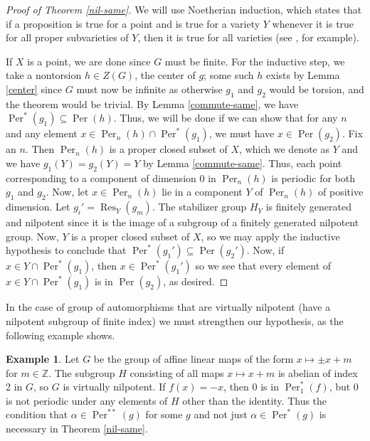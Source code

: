 \documentclass{amsart}
\newcommand{\bZ} {\mathbb{Z}}
\DeclareMathOperator{\Per}{Per}
\DeclareMathOperator{\Res}{Res}
\theoremstyle{definition}
\newtheorem{example}[thm]{Example}
\begin{document}
\begin{proof}[Proof of Theorem \ref{nil-same}]
 
  We will use Noetherian induction, which states that if a proposition
  is true for a point and is true for a variety $Y$ whenever it is
  true for all proper subvarieties of $Y$, then it is true for all
  varieties (see \cite[Ex. II.3.16]{Har}, for example).  

  If $X$ is a point, we are done since $G$ must be finite.  For the
  inductive step, we take a nontorsion $h \in Z(G)$, the center of
  $g$; some such $h$ exists by Lemma \ref{center} since $G$ must now
  be infinite as otherwise $g_1$ and $g_2$ would be torsion, and the
  theorem would be trivial.  By Lemma \ref{commute-same}, we have
  $\Per^{*}(g_1) \subseteq \Per(h)$.  Thus, we will be done if we can
  show that for any $n$ and any element
  $x \in \Per_n(h) \cap \Per^{*}(g_1)$, we must have
  $x \in \Per(g_2)$.  Fix an $n$.  Then $\Per_n(h)$ is a proper closed
  subset of $X$, which we denote as $Y$ and we have
  $g_1(Y) = g_2(Y) = Y$ by Lemma \ref{commute-same}.  Thus, each point
  corresponding to a component of dimension 0 in $\Per_n(h)$ is
  periodic for both $g_1$ and $g_2$.  Now, let $x \in \Per_n(h)$ lie
  in a component $Y$ of $\Per_n(h)$ of positive dimension.  Let
  $g_i' = \Res_Y(g_m)$.  The stabilizer group $H_Y$ is finitely
  generated and nilpotent since it is the image of a subgroup of a
  finitely generated nilpotent group.  Now, $Y$ is a proper closed
  subset of $X$, so we may
  apply the inductive hypothesis to conclude that
  $\Per^{*}(g_1') \subseteq \Per(g_2')$. Now, if
  $x \in Y \cap \Per^{*}(g_1)$, then $x \in \Per^*(g_1')$ so we see
  that every element of $x \in Y \cap \Per^{*}(g_1)$ is in
  $\Per(g_2)$, as desired.
\end{proof}

In the case of group of automorphisms that are virtually nilpotent
(have a nilpotent subgroup of finite index) we must strengthen our
hypothesis, as the following example shows.  

\begin{example}\label{nil-ex}
Let $G$ be the group of affine linear maps of the form $x \mapsto
\pm x +m $ for $m \in \bZ$.  The subgroup $H$ consisting of all maps
$x \mapsto x +m$ is abelian of index 2 in $G$, so $G$ is virtually
nilpotent.  If $f(x) = -x$, then 0 is in $\Per_1^*(f)$, but 0 is not
periodic under any elements of $H$ other than the identity.  Thus the
condition that $\alpha \in \Per^{**}(g)$ for some $g$ and not just
$\alpha \in \Per^*(g)$ is necessary in Theorem \ref{nil-same}.  
\end{example}
\end{document}
